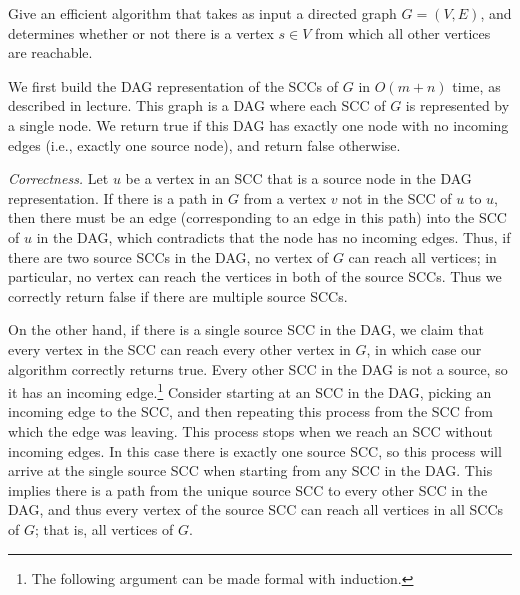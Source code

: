  \begin{exercise}[DPV 3.22] 
    Give an efficient algorithm that takes as input a directed graph $G = (V,E)$, and determines whether or not there is a vertex $s \in V$ from which all other vertices are reachable.
  \end{exercise}
  \begin{solution}
    We first build the DAG representation of the SCCs of $G$ in $O(m+n)$ time, as described in lecture. This graph is a DAG where each SCC of $G$ is represented by a single node. We return true if this DAG has exactly one node with no incoming edges (i.e., exactly one source node), and return false otherwise.

    \textit{Correctness.} Let $u$ be a vertex in an SCC that is a source node in the DAG representation. If there is a path in $G$ from a vertex $v$ not in the SCC of $u$ to $u$, then there must be an edge (corresponding to an edge in this path) into the SCC of $u$ in the DAG, which contradicts that the node has no incoming edges. Thus, if there are two source SCCs in the DAG, no vertex of $G$ can reach all vertices; in particular, no vertex can reach the vertices in both of the source SCCs. Thus we correctly return false if there are multiple source SCCs. 
    
    On the other hand, if there is a single source SCC in the DAG, we claim that every vertex in the SCC can reach every other vertex in $G$, in which case our algorithm correctly returns true. Every other SCC in the DAG is not a source, so it has an incoming edge.\footnote{The following argument can be made formal with induction.} Consider starting at an SCC in the DAG, picking an incoming edge to the SCC, and then repeating this process from the SCC from which the edge was leaving. This process stops when we reach an SCC without incoming edges. In this case there is exactly one source SCC, so this process will arrive at the single source SCC when starting from any SCC in the DAG. This implies there is a path from the unique source SCC to every other SCC in the DAG, and thus every vertex of the source SCC can reach all vertices in all SCCs of $G$; that is, all vertices of $G$.
  \end{solution}

